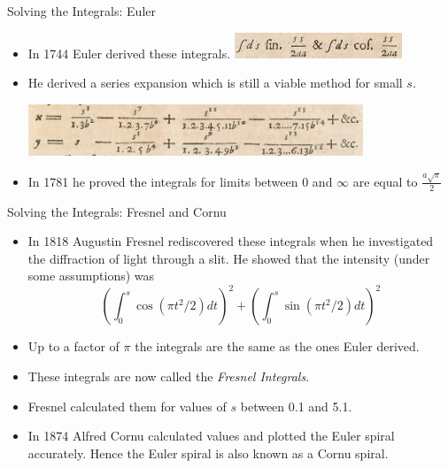 \documentclass{beamer}
\begin{document}
\begin{frame}{Solving the Integrals: Euler}
	\begin{itemize}
		\item In 1744 Euler derived these integrals.
		\includegraphics[width=50mm, scale=0.5]{euler_scripture_1.png}	
		\item He derived a series expansion which is still a viable method for small $s$.
		
		\includegraphics[width=100mm, scale=0.7]{euler_scripture.png}
		
		\item In 1781 he proved the integrals for limits between 0 and $\infty$ are equal to  $\frac{a \sqrt{\pi}}{2}$ 
	\end{itemize}
\end{frame}

\begin{frame}{Solving the Integrals: Fresnel and Cornu}
	\begin{itemize}
		\item In 1818 Augustin Fresnel rediscovered these integrals when he investigated the diffraction of light through a slit. He showed that the intensity (under some assumptions) was 
		\[
		\left( \int_{0}^{s}\cos \left( \pi t^2 / 2 \right) dt \right) ^2 + 
		\left( \int_{0}^{s}\sin \left( \pi t^2 / 2 \right) dt \right) ^2
		\] 
		\item Up to a factor of $\pi$ the integrals are the same as the ones Euler derived.
		\item These integrals are now called the \emph{Fresnel Integrals}.
		\item Fresnel calculated them for values of $s$ between 0.1 and 5.1.
		\item In 1874 Alfred Cornu calculated values and plotted the Euler spiral accurately. Hence the Euler spiral is also known as a Cornu spiral.
	\end{itemize}
\end{frame}
\end{document}
